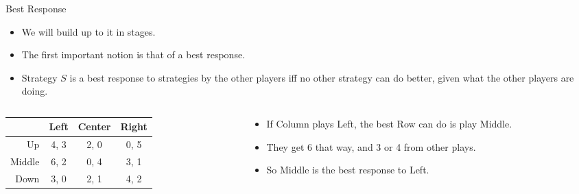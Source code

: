 \documentclass[
  14pt,
  letterpaper,
  ignorenonframetext,
  aspectratio=169,
  handout]{beamer}
\providecommand{\tightlist}{%
  \setlength{\itemsep}{0pt}\setlength{\parskip}{0pt}}\usepackage{longtable,booktabs,array}
\let\olditem\item
\renewcommand{\item}{%
\olditem\vspace{6pt}}
\begin{document}
\begin{frame}{Best Response}
\protect\hypertarget{best-response}{}
\begin{itemize}[<+->]
\tightlist
\item
  We will build up to it in stages.
\item
  The first important notion is that of a best response.
\item
  Strategy \(S\) is a best response to strategies by the other players
  iff no other strategy can do better, given what the other players are
  doing.
\end{itemize}
\end{frame}

\begin{frame}[plain]{}
\protect\hypertarget{section-9}{}
\begin{columns}[T]
\begin{column}{0.5\textwidth}
\begin{table}[!h]
\centering
\begin{tabular}[t]{>{}r|ccc}
\toprule
 & Left & Center & Right\\
\midrule
Up & 4, 3 & 2, 0 & 0, 5\\
Middle & 6, 2 & 0, 4 & 3, 1\\
Down & 3, 0 & 2, 1 & 4, 2\\
\bottomrule
\end{tabular}
\end{table}
\end{column}

\begin{column}{0.5\textwidth}
\begin{itemize}[<+->]
\tightlist
\item
  If Column plays Left, the best Row can do is play Middle.
\item
  They get 6 that way, and 3 or 4 from other plays.
\item
  So Middle is the best response to Left.
\end{itemize}
\end{column}
\end{columns}
\end{frame}
\end{document}
